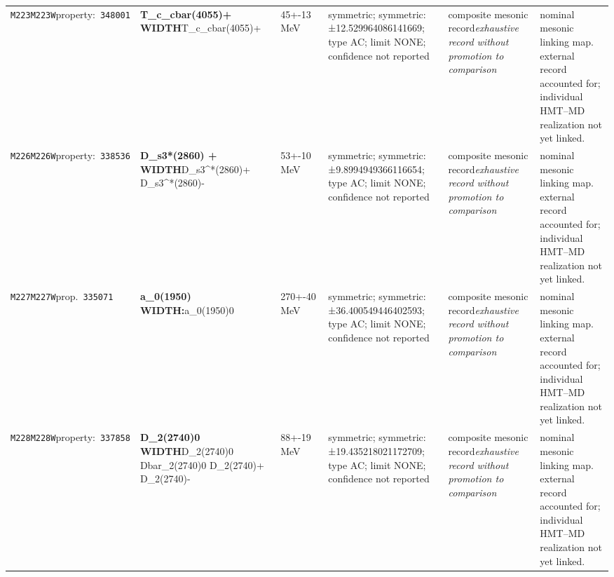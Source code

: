 \begin{landscape}
\begin{longtable}{L{1.85cm}L{4.45cm}L{2.35cm}L{4.05cm}L{3.35cm}L{7.15cm}}
\texttt{M223}\newline \texttt{M223W}\newline property:\ \texttt{348001} & \textbf{T\_\allowbreak{}c\_\allowbreak{}cbar(4055)+ WIDTH}\newline T\_\allowbreak{}c\_\allowbreak{}cbar(4055)+ & 45+-13\,MeV & symmetric; symmetric: ±12.529964086141669; type AC; limit NONE; confidence not reported & composite mesonic record\newline \emph{exhaustive record without promotion to comparison} & nominal mesonic linking map. external record accounted for; individual HMT--MD realization not yet linked. \\
\texttt{M226}\newline \texttt{M226W}\newline property:\ \texttt{338536} & \textbf{D\_\allowbreak{}s3*(2860) + WIDTH}\newline D\_\allowbreak{}s3\textasciicircum{}*(2860)+ \textbar{}\allowbreak{} D\_\allowbreak{}s3\textasciicircum{}*(2860)- & 53+-10\,MeV & symmetric; symmetric: ±9.8994949366116654; type AC; limit NONE; confidence not reported & composite mesonic record\newline \emph{exhaustive record without promotion to comparison} & nominal mesonic linking map. external record accounted for; individual HMT--MD realization not yet linked. \\
\texttt{M227}\newline \texttt{M227W}\newline prop.\ \texttt{335071} & \textbf{a\_\allowbreak{}0(1950) WIDTH:}\newline a\_\allowbreak{}0(1950)0 & 270+-40\,MeV & symmetric; symmetric: ±36.400549446402593; type AC; limit NONE; confidence not reported & composite mesonic record\newline \emph{exhaustive record without promotion to comparison} & nominal mesonic linking map. external record accounted for; individual HMT--MD realization not yet linked. \\
\texttt{M228}\newline \texttt{M228W}\newline property:\ \texttt{337858} & \textbf{D\_\allowbreak{}2(2740)0 WIDTH}\newline D\_\allowbreak{}2(2740)0 \textbar{}\allowbreak{} Dbar\_\allowbreak{}2(2740)0 \textbar{}\allowbreak{} D\_\allowbreak{}2(2740)+ \textbar{}\allowbreak{} D\_\allowbreak{}2(2740)- & 88+-19\,MeV & symmetric; symmetric: ±19.435218021172709; type AC; limit NONE; confidence not reported & composite mesonic record\newline \emph{exhaustive record without promotion to comparison} & nominal mesonic linking map. external record accounted for; individual HMT--MD realization not yet linked. \\

\end{longtable}
\end{landscape}
